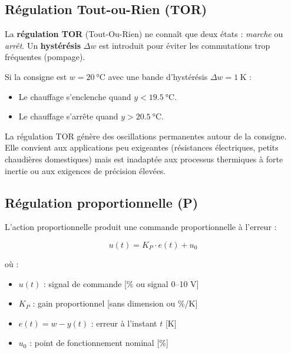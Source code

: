 \subsection{Régulation Tout-ou-Rien (TOR)}

\begin{definition}
  La \textbf{régulation TOR} (Tout-Ou-Rien) ne connaît que deux états : \textit{marche} ou \textit{arrêt}. Un \textbf{hystérésis} $\Delta w$ est introduit pour éviter les commutations trop fréquentes (pompage).
\end{definition}

Si la consigne est $w = \SI{20}{\celsius}$ avec une bande d'hystérésis $\Delta w = \SI{1}{\kelvin}$ :
\begin{itemize}
  \item Le chauffage s'enclenche quand $y < \SI{19.5}{\celsius}$.
  \item Le chauffage s'arrête quand $y > \SI{20.5}{\celsius}$.
\end{itemize}

\begin{attention}
  La régulation TOR génère des oscillations permanentes autour de la consigne. Elle convient aux applications peu exigeantes (résistances électriques, petits chaudières domestiques) mais est inadaptée aux processus thermiques à forte inertie ou aux exigences de précision élevées.
\end{attention}

\subsection{Régulation proportionnelle (P)}

L'action proportionnelle produit une commande proportionnelle à l'erreur :

\begin{equation}
  u(t) = K_P \cdot e(t) + u_0
\end{equation}

où :
\begin{itemize}
  \item $u(t)$ : signal de commande [$\%$ ou signal 0–10 V]
  \item $K_P$ : gain proportionnel [sans dimension ou \%/K]
  \item $e(t) = w - y(t)$ : erreur à l'instant $t$ [\si{\kelvin}]
  \item $u_0$ : point de fonctionnement nominal [\%]
\end{itemize}

